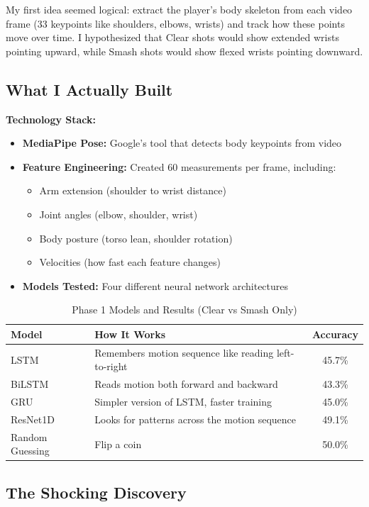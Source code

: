 \documentclass[11pt,a4paper]{article}
\begin{document}
My first idea seemed logical: extract the player's body skeleton from each video frame (33 keypoints like shoulders, elbows, wrists) and track how these points move over time. I hypothesized that Clear shots would show extended wrists pointing upward, while Smash shots would show flexed wrists pointing downward.

\subsection{What I Actually Built}

\textbf{Technology Stack:}
\begin{itemize}
\item \textbf{MediaPipe Pose:} Google's tool that detects body keypoints from video
\item \textbf{Feature Engineering:} Created 60 measurements per frame, including:
  \begin{itemize}
  \item Arm extension (shoulder to wrist distance)
  \item Joint angles (elbow, shoulder, wrist)
  \item Body posture (torso lean, shoulder rotation)
  \item Velocities (how fast each feature changes)
  \end{itemize}
\item \textbf{Models Tested:} Four different neural network architectures
\end{itemize}

\begin{table}[H]
\centering
\caption{Phase 1 Models and Results (Clear vs Smash Only)}
\begin{tabular}{lp{6cm}c}
\toprule
\textbf{Model} & \textbf{How It Works} & \textbf{Accuracy} \\
\midrule
LSTM & Remembers motion sequence like reading left-to-right & 45.7\% \\
BiLSTM & Reads motion both forward and backward & 43.3\% \\
GRU & Simpler version of LSTM, faster training & 45.0\% \\
ResNet1D & Looks for patterns across the motion sequence & 49.1\% \\
\midrule
Random Guessing & Flip a coin & 50.0\% \\
\bottomrule
\end{tabular}
\end{table}

\subsection{The Shocking Discovery}
\end{document}
